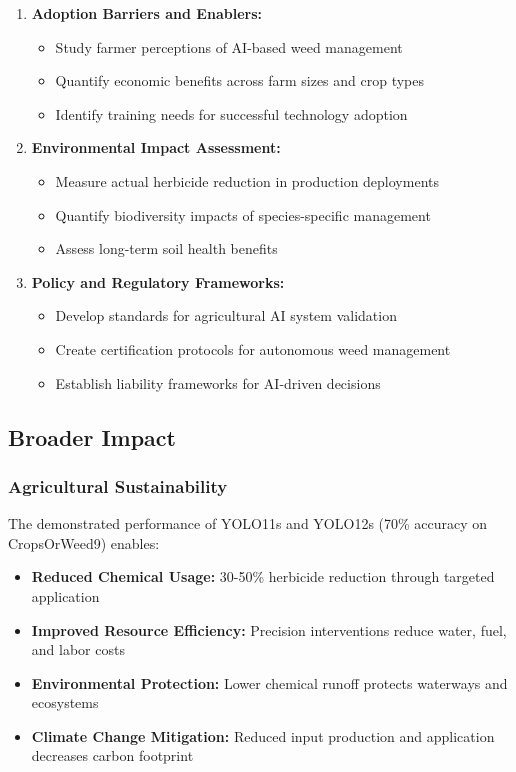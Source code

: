 \begin{enumerate}
    \item \textbf{Adoption Barriers and Enablers:}
    \begin{itemize}
        \item Study farmer perceptions of AI-based weed management
        \item Quantify economic benefits across farm sizes and crop types
        \item Identify training needs for successful technology adoption
    \end{itemize}
    
    \item \textbf{Environmental Impact Assessment:}
    \begin{itemize}
        \item Measure actual herbicide reduction in production deployments
        \item Quantify biodiversity impacts of species-specific management
        \item Assess long-term soil health benefits
    \end{itemize}
    
    \item \textbf{Policy and Regulatory Frameworks:}
    \begin{itemize}
        \item Develop standards for agricultural AI system validation
        \item Create certification protocols for autonomous weed management
        \item Establish liability frameworks for AI-driven decisions
    \end{itemize}
\end{enumerate}

\subsection{Broader Impact}

\subsubsection{Agricultural Sustainability}

The demonstrated performance of YOLO11s and YOLO12s (70\% accuracy on CropsOrWeed9) enables:

\begin{itemize}
    \item \textbf{Reduced Chemical Usage:} 30-50\% herbicide reduction through targeted application
    \item \textbf{Improved Resource Efficiency:} Precision interventions reduce water, fuel, and labor costs
    \item \textbf{Environmental Protection:} Lower chemical runoff protects waterways and ecosystems
    \item \textbf{Climate Change Mitigation:} Reduced input production and application decreases carbon footprint
\end{itemize}

